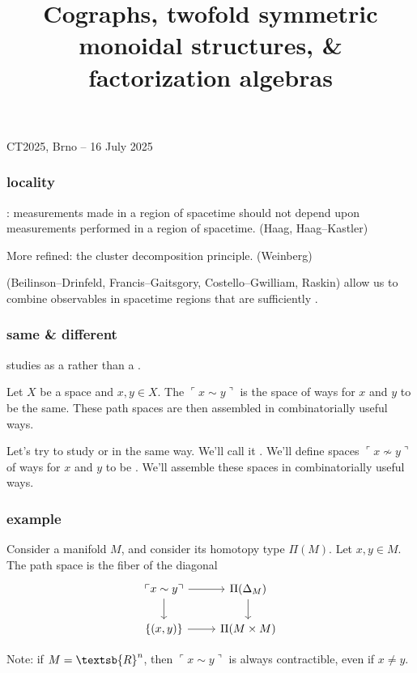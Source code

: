 \documentclass[11pt,xcolor={dvipsnames},hyperref={pdftex,pdfpagemode=UseNone,hidelinks,pdfdisplaydoctitle=true},usepdftitle=false]{beamer}
\newcommand{\enquine}[1]{\ulcorner {#1} \urcorner}
\begin{document}
\title{Cographs, twofold symmetric monoidal structures, \& factorization algebras}

{CT2025, Brno -- 16 July 2025}

\frame{\titlepage}

\begin{frame}
  \frametitle{locality}
  : measurements made in a region of spacetime should not depend upon measurements performed in a  region of spacetime. (Haag, Haag--Kastler)

  \bigskip

  More refined: the cluster decomposition principle. (Weinberg)

  \bigskip

   (Beilinson--Drinfeld, Francis--Gaitsgory, Costello--Gwilliam, Raskin) allow us to combine observables in spacetime regions that are sufficiently .
\end{frame}

\begin{frame}
  \frametitle{same \& different}
   studies  as a  rather than a .

  \bigskip

  Let $X$ be a space and $x,y \in X$.
  The  $\enquine{x \sim y}$ is the space of ways for $x$ and $y$ to be the same.
  These path spaces are then assembled in combinatorially useful ways.

  \bigskip

  Let's try to study  or  in the same way.
  We'll call it .
  We'll define spaces $\enquine{x \nsim y}$ of ways for $x$ and $y$ to be .
  We'll assemble these spaces in combinatorially useful ways.
\end{frame}

\begin{frame}
  \frametitle{example}
  Consider a manifold $M$, and consider its homotopy type $\Pi(M)$.
  Let $x,y \in M$.
  The path space is the fiber of the diagonal
  \[
  \begin{tikzcd}[ampersand replacement=\&]
    \enquine{x \sim y} \arrow[d] \arrow[r] \& \Pi(\Delta_M) \arrow[d] \\
    \{(x,y)\} \arrow[r] \& \Pi(M \times M)
  \end{tikzcd}
  \]

  Note: if $M = \textsb{R}^n$, then $\enquine{x \sim y}$ is always contractible, even if $x \neq y$.
\end{frame}
\end{document}
